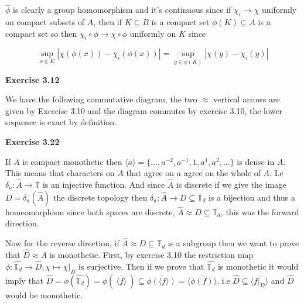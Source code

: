 \documentclass{article}
\begin{document}
\vspace{0.5cm}

$\widehat \phi$ is clearly a group homomorphism and it's continuous since if $\chi_i \rightarrow \chi$ uniformly on compact subsets of $A$, then if $K \subseteq B$ is a compact set $\phi(K) \subseteq A$ is a compact set so then $\chi_i \circ \phi \rightarrow \chi \circ \phi$ uniformly on $K$ since

$$ \sup\limits_{x \in K} |\chi(\phi(x)) -  \chi_i(\phi(x))| = \sup\limits_{y \in \phi(K)} |\chi(y) -  \chi_i(y)|$$

\vspace{0.5cm}

\textbf{Exercise 3.12}

\vspace{0.5cm}

We have the following commutative diagram, the two $\approx$ vertical arrows are given by Exercise 3.10 and the diagram commutes by exercise 3.10, the lower sequence is exact by definition.


\vspace{0.5cm}

\textbf{Exercise 3.22}

\vspace{0.5cm}

If $A$ is compact monothetic then $\langle a \rangle = \{..., a^{-2}, a^{-1}, 1, a^1, a^2,... \}$ is dense in $A$. This means that characters on $A$ that agree on $a$ agree on the whole of $A$. I.e $\delta_a : \widehat A \rightarrow \mathbb T$ is an injective function. And since $\widehat A$ is discrete if we give the image $ D =\delta_a(\widehat A)$ the discrete topology then $\delta_a : \widehat A \rightarrow D \subseteq \mathbb T_d$ is a bijection and thus a homeomorphism since both spaces are discrete, $\widehat A \approx D \subseteq \mathbb T_d$, this was the forward direction.

\vspace{0.3cm}

Now for the reverse direction, if $\widehat{A} \approx D \subseteq \mathbb T_d$ is a subgroup then we want to prove that $\widehat D \approx A$ is monothetic. First, by exercise 3.10 the restriction map $\phi:\widehat{\mathbb T_d} \rightarrow \widehat{D}, \chi \mapsto \chi|_D$ is surjective. Then if we prove that $\widehat{\mathbb T_d}$ is monothetic it would imply that $\widehat D = \phi(\widehat{\mathbb T_d}) =\phi( \ \overline{\langle f \rangle} \ ) \subseteq \overline{\phi( {\langle f \rangle} )} = \overline{\langle\phi(f)\rangle}$, i.e $\widehat D \subseteq \overline{\langle f|_D \rangle}$ and $\widehat D$ would be monothetic.
\end{document}
